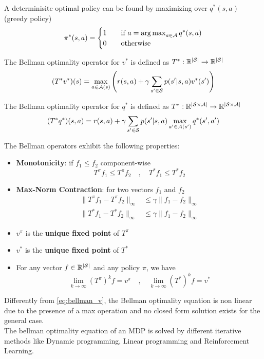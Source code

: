 A determinisitc optimal policy can be found by maximizing over $q^*(s,a)$ (greedy policy)
\begin{equation*}
    \pi^*(s,a) = 
    \begin{cases}
        1 \quad & \text{if } a = \operatorname*{arg\,max}_{a \in \mathcal{A}}q^*(s,a)\\
        0 \quad & \text{otherwise}
    \end{cases}
\end{equation*}


\begin{definition}
    The Bellman optimality operator for $v^*$ is defined as $T^* : \mathbb{R}^{|\mathcal{S}|} \to \mathbb{R}^{|\mathcal{S}|}$
    \[(T^* v^*)(s) = \max_{a \in \mathcal{A}(s)}\left(r(s,a) + \gamma \sum_{s' \in \mathcal{S}}p(s'|s,a)v^*(s')\right)\]
\end{definition}

\begin{definition}
    The Bellman optimality operator for $q^*$ is defined as $T^* : \mathbb{R}^{|\mathcal{S} \times \mathcal{A}|} \to \mathbb{R}^{|\mathcal{S} \times \mathcal{A}|}$
    \[(T^* q^*)(s, a) = r(s,a) + \gamma \sum_{s' \in \mathcal{S}}p(s'|s,a)\max_{a' \in \mathcal{A}(s')}q^*(s',a')\]
\end{definition}

The Bellman operators exhibit the following properties:
\begin{itemize}
    \item \textbf{Monotonicity}: if $f_1 \le f_2$ component-wise \\
    \[T^\pi f_1 \le T^\pi f_2 \quad,\quad T^*f_1 \le T^*f_2\]
    \item \textbf{Max-Norm Contraction}: for two vectors $f_1$ and $f_2$ \\
    \begin{align*}
    \lVert T^\pi f_1 - T^\pi f_2 \rVert _\infty &\le \gamma \lVert f_1 - f_2 \rVert _\infty \\
    \lVert T^* f_1 - T^* f_2 \rVert _\infty &\le \gamma \lVert f_1 - f_2 \rVert _\infty
    \end{align*}
    \item $v^\pi$ is the \textbf{unique fixed point} of $T^\pi$
    \item $v^*$ is the \textbf{unique fixed point} of $T^*$
    \item For any vector $f \in \mathbb{R}^{|\mathcal{S}|}$ and any policy $\pi$, we have \\
    \[\lim_{k \to \infty}(T^\pi)^kf = v^\pi \quad,\quad \lim_{k \to \infty}(T^*)^kf = v^*\]
    
\end{itemize}

Differently from \eqref{eq:bellman_v}, the Bellman optimality equation is non linear due to the presence of a max operation
and no closed form solution exists for the general case.
\\
The bellman optimality equation of an MDP is solved by different iterative methods like Dynamic programming, Linear programming and Reinforcement Learning.

